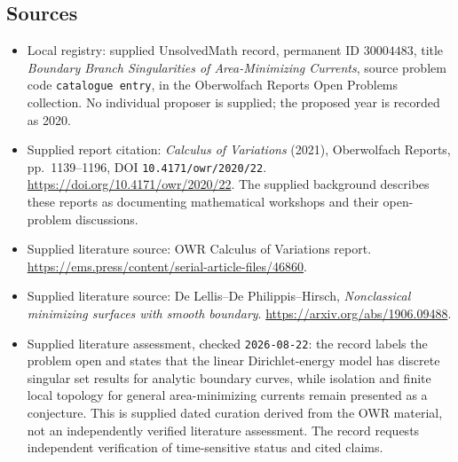 \documentclass[11pt]{article}
\begin{document}
\subsection{Sources}
\begin{itemize}
\item Local registry: supplied UnsolvedMath record, permanent ID \(30004483\), title \emph{Boundary Branch Singularities of Area-Minimizing Currents}, source problem code \texttt{catalogue entry}, in the Oberwolfach Reports Open Problems collection. No individual proposer is supplied; the proposed year is recorded as 2020.
\item Supplied report citation: \emph{Calculus of Variations} (2021), Oberwolfach Reports, pp.\ 1139--1196, DOI \texttt{10.4171/owr/2020/22}. \url{https://doi.org/10.4171/owr/2020/22}. The supplied background describes these reports as documenting mathematical workshops and their open-problem discussions.
\item Supplied literature source: OWR Calculus of Variations report. \url{https://ems.press/content/serial-article-files/46860}.
\item Supplied literature source: De Lellis--De Philippis--Hirsch, \emph{Nonclassical minimizing surfaces with smooth boundary}. \url{https://arxiv.org/abs/1906.09488}.
\item Supplied literature assessment, checked \texttt{2026-08-22}: the record labels the problem open and states that the linear Dirichlet-energy model has discrete singular set results for analytic boundary curves, while isolation and finite local topology for general area-minimizing currents remain presented as a conjecture. This is supplied dated curation derived from the OWR material, not an independently verified literature assessment. The record requests independent verification of time-sensitive status and cited claims.
\end{itemize}
\end{document}
